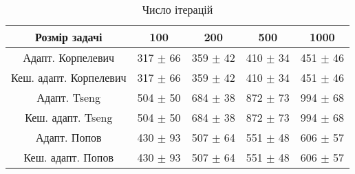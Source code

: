 \begin{table}[H]
	\centering
	\begin{tabular}{|c||c|c|c|c|}\hline
		Розмір задачі & 100 & 200 & 500 & 1000 \\ \hline \hline
		Адапт. Корпелевич & 317 $\pm$ 66 & 359 $\pm$ 42 & 410 $\pm$ 34 & 451 $\pm$ 46 \\ \hline
		Кеш. адапт. Корпелевич & 317 $\pm$ 66 & 359 $\pm$ 42 & 410 $\pm$ 34 & 451 $\pm$ 46 \\ \hline
		Адапт. Tseng & 504 $\pm$ 50 & 684 $\pm$ 38 & 872 $\pm$ 73 & 994 $\pm$ 68 \\ \hline
		Кеш. адапт. Tseng & 504 $\pm$ 50 & 684 $\pm$ 38 & 872 $\pm$ 73 & 994 $\pm$ 68 \\ \hline
		Адапт. Попов & 430 $\pm$ 93 & 507 $\pm$ 64 & 551 $\pm$ 48 & 606 $\pm$ 57 \\ \hline
		Кеш. адапт. Попов & 430 $\pm$ 93 & 507 $\pm$ 64 & 551 $\pm$ 48 & 606 $\pm$ 57 \\ \hline
	\end{tabular}
	\caption{Число ітерацій}
\end{table}
